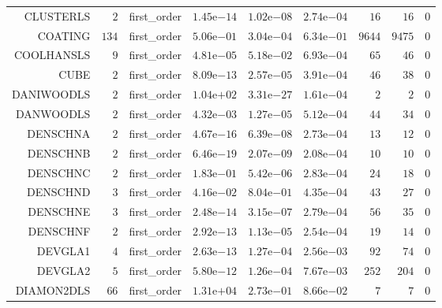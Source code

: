 \begin{longtable}{rrrrrrrrr}
CLUSTERLS & \(     2\) & first\_order & \( 1.45\)e\(-14\) & \( 1.02\)e\(-08\) & \( 2.74\)e\(-04\) & \(    16\) & \(    16\) & \(     0\) \\
COATING & \(   134\) & first\_order & \( 5.06\)e\(-01\) & \( 3.04\)e\(-04\) & \( 6.34\)e\(-01\) & \(  9644\) & \(  9475\) & \(     0\) \\
COOLHANSLS & \(     9\) & first\_order & \( 4.81\)e\(-05\) & \( 5.18\)e\(-02\) & \( 6.93\)e\(-04\) & \(    65\) & \(    46\) & \(     0\) \\
CUBE & \(     2\) & first\_order & \( 8.09\)e\(-13\) & \( 2.57\)e\(-05\) & \( 3.91\)e\(-04\) & \(    46\) & \(    38\) & \(     0\) \\
DANIWOODLS & \(     2\) & first\_order & \( 1.04\)e\(+02\) & \( 3.31\)e\(-27\) & \( 1.61\)e\(-04\) & \(     2\) & \(     2\) & \(     0\) \\
DANWOODLS & \(     2\) & first\_order & \( 4.32\)e\(-03\) & \( 1.27\)e\(-05\) & \( 5.12\)e\(-04\) & \(    44\) & \(    34\) & \(     0\) \\
DENSCHNA & \(     2\) & first\_order & \( 4.67\)e\(-16\) & \( 6.39\)e\(-08\) & \( 2.73\)e\(-04\) & \(    13\) & \(    12\) & \(     0\) \\
DENSCHNB & \(     2\) & first\_order & \( 6.46\)e\(-19\) & \( 2.07\)e\(-09\) & \( 2.08\)e\(-04\) & \(    10\) & \(    10\) & \(     0\) \\
DENSCHNC & \(     2\) & first\_order & \( 1.83\)e\(-01\) & \( 5.42\)e\(-06\) & \( 2.83\)e\(-04\) & \(    24\) & \(    18\) & \(     0\) \\
DENSCHND & \(     3\) & first\_order & \( 4.16\)e\(-02\) & \( 8.04\)e\(-01\) & \( 4.35\)e\(-04\) & \(    43\) & \(    27\) & \(     0\) \\
DENSCHNE & \(     3\) & first\_order & \( 2.48\)e\(-14\) & \( 3.15\)e\(-07\) & \( 2.79\)e\(-04\) & \(    56\) & \(    35\) & \(     0\) \\
DENSCHNF & \(     2\) & first\_order & \( 2.92\)e\(-13\) & \( 1.13\)e\(-05\) & \( 2.54\)e\(-04\) & \(    19\) & \(    14\) & \(     0\) \\
DEVGLA1 & \(     4\) & first\_order & \( 2.63\)e\(-13\) & \( 1.27\)e\(-04\) & \( 2.56\)e\(-03\) & \(    92\) & \(    74\) & \(     0\) \\
DEVGLA2 & \(     5\) & first\_order & \( 5.80\)e\(-12\) & \( 1.26\)e\(-04\) & \( 7.67\)e\(-03\) & \(   252\) & \(   204\) & \(     0\) \\
DIAMON2DLS & \(    66\) & first\_order & \( 1.31\)e\(+04\) & \( 2.73\)e\(-01\) & \( 8.66\)e\(-02\) & \(     7\) & \(     7\) & \(     0\) \\

\end{longtable}
